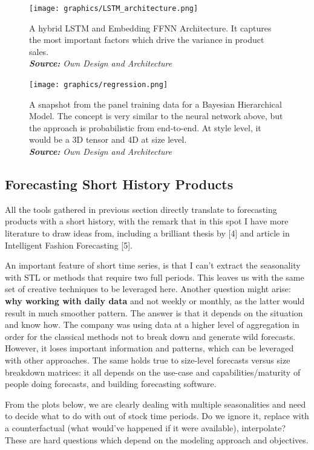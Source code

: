 \documentclass[12pt]{article}
\begin{document}
\begin{figure}[!ht]
	\centering
	\texttt{[image: graphics/LSTM\_architecture.png]}%
	\caption{A hybrid LSTM and Embedding FFNN Architecture. It captures the most important factors which drive the variance in product sales. \\
		\textit{\textbf{Source:} Own Design and Architecture}}
\end{figure}

\begin{figure}[!ht]
	\centering
	\texttt{[image: graphics/regression.png]}%
	\caption{A snapshot from the panel training data for a Bayesian Hierarchical Model. The concept is very similar to the neural network above, but the approach is probabilistic from end-to-end. At style level, it would be a 3D tensor and 4D at size level. \\
		\textit{\textbf{Source:} Own Design and Architecture}}
\end{figure}


\subsection{Forecasting Short History Products}

All the tools gathered in previous section directly translate to forecasting products with a short history, with the remark that in this spot I have more literature to draw ideas from, including a brilliant thesis by [4] and article in Intelligent Fashion Forecasting [5].

An important feature of short time series, is that I can't extract the seasonality with STL or methods that require two full periods. This leaves us with the same set of creative techniques to be leveraged here. Another question might arise: \textbf{why working with daily data} and not weekly or monthly, as the latter would result in much smoother pattern. The answer is that it depends on the situation and know how. The company was using data at a higher level of aggregation in order for the classical methods not to break down and generate wild forecasts. However, it loses important information and patterns, which can be leveraged with other approaches. The same holds true to size-level forecasts versus size breakdown matrices: it all depends on the use-case and capabilities/maturity of people doing forecasts, and building forecasting software.

From the plots below, we are clearly dealing with multiple seasonalities and need to decide what to do with out of stock time periods. Do we ignore it, replace with a counterfactual (what would've happened if it were available), interpolate? These are hard questions which depend on the modeling approach and objectives.
\end{document}
